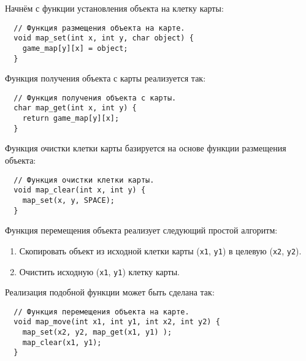 \documentclass[../sparc.tex]{subfiles}
\begin{document}
Начнём с функции установления объекта на клетку карты:

\begin{verbatim}
  // Функция размещения объекта на карте.
  void map_set(int x, int y, char object) {
    game_map[y][x] = object;
  }
\end{verbatim}

Функция получения объекта с карты реализуется так:

\begin{verbatim}
  // Функция получения объекта с карты.
  char map_get(int x, int y) {
    return game_map[y][x];
  }
\end{verbatim}

Функция очистки клетки карты базируется на основе функции размещения объекта:

\begin{verbatim}
  // Функция очистки клетки карты.
  void map_clear(int x, int y) {
    map_set(x, y, SPACE);
  }
\end{verbatim}

Функция перемещения объекта реализует следующий простой алгоритм:
\begin{enumerate}
\item Скопировать объект из исходной клетки карты (\texttt{x1}, \texttt{y1}) в
  целевую (\texttt{x2}, \texttt{y2}).
\item Очистить исходную (\texttt{x1}, \texttt{y1}) клетку карты.
\end{enumerate}

Реализация подобной функции может быть сделана так:

\begin{verbatim}
  // Функция перемещения объекта на карте.
  void map_move(int x1, int y1, int x2, int y2) {
    map_set(x2, y2, map_get(x1, y1) );
    map_clear(x1, y1);
  }
\end{verbatim}
\end{document}
